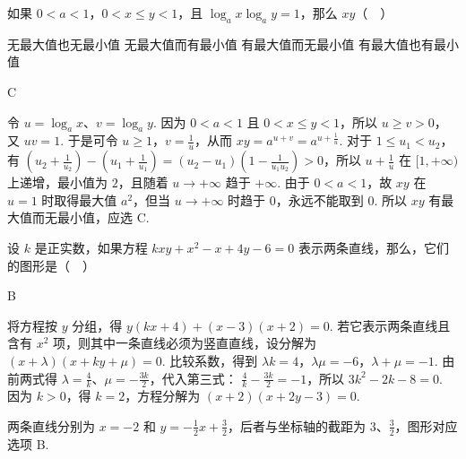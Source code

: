 \begin{problem}
如果 \(0<a<1\)，\(0<x\leqslant y<1\)，且 \(\log_a x\log_a y=1\)，那么 \(xy\)（\(\quad\)）

\choices
    {无最大值也无最小值}
    {无最大值而有最小值}
    {有最大值而无最小值}
    {有最大值也有最小值}
\end{problem}

\begin{answer}
C
\end{answer}

\begin{solution}
令 \(u=\log_a x\)、\(v=\log_a y\). 因为 \(0<a<1\) 且 \(0<x\leqslant y<1\)，所以 \(u\geqslant v>0\)，又 \(uv=1\). 于是可令 \(u\geqslant1\)，\(v=\frac1u\)，从而
\(xy=a^{u+v}=a^{u+\frac{1}{u}}\). 对于 \(1\leqslant u_1<u_2\)，有
\(\left(u_2+\frac1{u_2}\right)-\left(u_1+\frac1{u_1}\right)=(u_2-u_1)\left(1-\frac1{u_1u_2}\right)>0\)，所以 \(u+\frac1u\) 在 \([1,+\infty)\) 上递增，最小值为 \(2\)，且随着 \(u\to+\infty\) 趋于 \(+\infty\). 由于 \(0<a<1\)，故 \(xy\) 在 \(u=1\) 时取得最大值 \(a^2\)，但当 \(u\to+\infty\) 时趋于 \(0\)，永远不能取到 \(0\). 所以 \(xy\) 有最大值而无最小值，应选 C.
\end{solution}

\begin{problem}
设 \(k\) 是正实数，如果方程 \(kxy+x^2-x+4y-6=0\) 表示两条直线，那么，它们的图形是（\(\quad\)）

    {}
    {}
    {}
\end{problem}

\begin{answer}
B
\end{answer}

\begin{solution}
将方程按 \(y\) 分组，得
\(y(kx+4)+(x-3)(x+2)=0\). 若它表示两条直线且含有 \(x^2\) 项，则其中一条直线必须为竖直直线，设分解为
\((x+\lambda)(x+ky+\mu)=0\). 比较系数，得到
\(\lambda k=4\)，\(\lambda\mu=-6\)，\(\lambda+\mu=-1\). 由前两式得 \(\lambda=\frac4k\)、\(\mu=-\frac{3k}{2}\)，代入第三式：
\(\frac4k-\frac{3k}{2}=-1\)，所以 \(3k^2-2k-8=0\). 因为 \(k>0\)，得 \(k=2\)，方程分解为
\((x+2)(x+2y-3)=0\).

两条直线分别为 \(x=-2\) 和 \(y=-\frac12x+\frac32\)，后者与坐标轴的截距为 \(3\)、\(\frac32\)，图形对应选项 B.
\end{solution}

